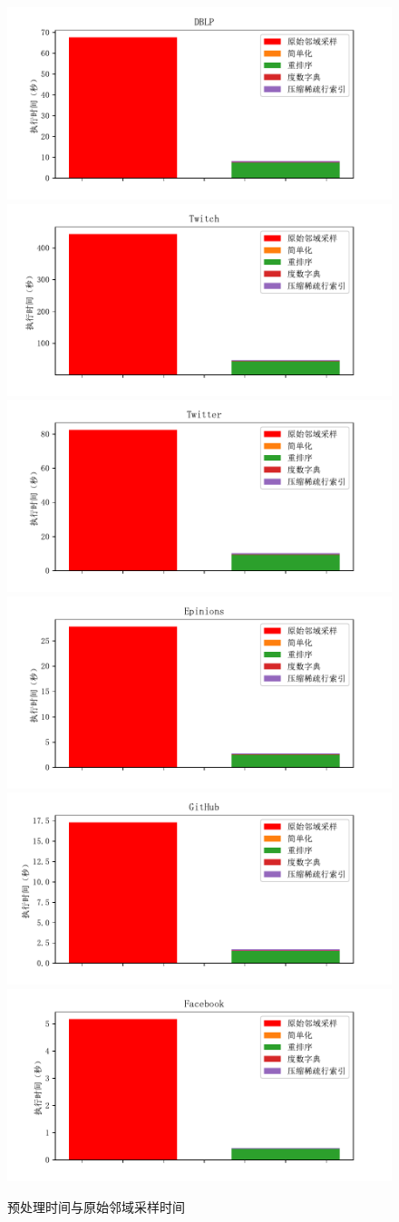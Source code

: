 \documentclass[master]{thesis-uestc}
\begin{document}
\begin{figure}
    \includegraphics[width=0.5\linewidth]{pic/preTime/DBLP.pdf}%
    \includegraphics[width=0.5\linewidth]{pic/preTime/Twitch.pdf}\\
    \includegraphics[width=0.5\linewidth]{pic/preTime/Twitter.pdf}%
    \includegraphics[width=0.5\linewidth]{pic/preTime/Epinions.pdf}\\
    \includegraphics[width=0.5\linewidth]{pic/preTime/GitHub.pdf}%
    \includegraphics[width=0.5\linewidth]{pic/preTime/Facebook.pdf}
    \caption{预处理时间与原始邻域采样时间}
    \label{fig:pre-time}
\end{figure}
\end{document}
